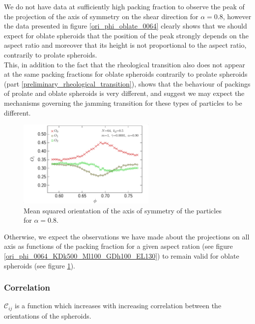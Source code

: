 \documentclass[class=report, float=false, crop=false]{standalone}
\begin{document}
We do not have data at sufficiently high packing fraction to observe the peak of the projection of the axis of symmetry on the shear direction for $\alpha=0.8$, however the data presented in figure \ref{ori_phi_oblate_0064} clearly shows that we should expect for oblate spheroids that the position of the peak strongly depends on the aspect ratio and moreover that its height is not proportional to the aspect ratio, contrarily to prolate spheroids.\\

This, in addition to the fact that the rheological transition also does not appear at the same packing fractions for oblate spheroids contrarily to prolate spheroids (part \ref{preliminary_rheological_transition}), shows that the behaviour of packings of prolate and oblate spheroids is very different, and suggest we may expect the mechanisms governing the jamming transition for these types of particles to be different.

\begin{figure}[h!]
\centering
\includegraphics[width=0.6\textwidth]{figures/figs/ori_phi_0064_KDk500_Ml100_GDh100_EL090}
\caption{Mean squared orientation of the axis of symmetry of the particles for $\alpha=0.8$.}
\label{ori_phi_0064_KDk500_Ml100_GDh100_EL090}
\end{figure}

Otherwise, we expect the observations we have made about the projections on all axis as functions of the packing fraction for a given aspect ration (see figure \ref{ori_phi_0064_KDk500_Ml100_GDh100_EL130}) to remain valid for oblate spheroids (see figure \ref{ori_phi_0064_KDk500_Ml100_GDh100_EL090}).

\subsubsection{Correlation}

$\mathcal{C}_{ij}$ is a function which increases with increasing correlation between the orientations of the spheroids.
\end{document}
